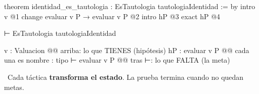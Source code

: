 \documentclass[12pt]{article}
\newcommand{\clave}[2]{\begin{tcolorbox}[colback=tldr, colframe=#1, boxrule=1pt, arc=4pt,
  left=6pt, right=6pt, top=3pt, bottom=3pt, before skip=3pt, after skip=4pt,
  before upper=\raggedright]\faLightbulb\ #2\end{tcolorbox}}
\begin{document}
\begin{minipage}[t]{0.40\textwidth}
\vspace{0pt}
\begin{leanL}[title={Thesis/Prop/Main.lean}]
theorem identidad_es_tautologia :
    EsTautologia tautologiaIdentidad := by
  intro v                              @1
  change evaluar v P → evaluar v P     @2
  intro hP                             @3
  exact hP                             @4
\end{leanL}
\begin{estado}[title={Inicio: lo primero que muestra Lean}]
⊢ EsTautologia tautologiaIdentidad
\end{estado}
\end{minipage}\hfill
\begin{minipage}[t]{0.57\textwidth}
\vspace{0pt}
\begin{estadoL}[title={Anatomía de un estado}]
v : Valuacion        @@ arriba: lo que TIENES (hipótesis)
hP : evaluar v P     @@ cada una es  nombre : tipo
⊢ evaluar v P        @@ tras ⊢: lo que FALTA (la meta)
\end{estadoL}
\clave{m2}{Cada táctica \textbf{transforma el estado}. La prueba termina cuando no quedan metas.}
\end{minipage}
\end{document}
